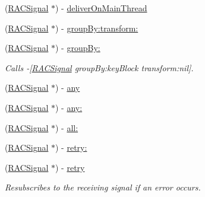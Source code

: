 \begin{DoxyCompactItemize}
\item 
(\mbox{\hyperlink{interface_r_a_c_signal}{R\+A\+C\+Signal}} $\ast$) -\/ \mbox{\hyperlink{category_r_a_c_signal_07_operations_08_a0c7042ce0eb6c729bc38421295296db1}{deliver\+On\+Main\+Thread}}
\item 
(\mbox{\hyperlink{interface_r_a_c_signal}{R\+A\+C\+Signal}} $\ast$) -\/ \mbox{\hyperlink{category_r_a_c_signal_07_operations_08_ad04cf174e24905df96f211b60e31a3cd}{group\+By\+:transform\+:}}
\item 
\mbox{\label{category_r_a_c_signal_07_operations_08_a35f9a656ad047d90f6997aee136782e5}} 
(\mbox{\hyperlink{interface_r_a_c_signal}{R\+A\+C\+Signal}} $\ast$) -\/ \mbox{\hyperlink{category_r_a_c_signal_07_operations_08_a35f9a656ad047d90f6997aee136782e5}{group\+By\+:}}
\begin{DoxyCompactList}\small\item\em Calls -\/\mbox{[}\mbox{\hyperlink{interface_r_a_c_signal}{R\+A\+C\+Signal}} group\+By\+:key\+Block transform\+:nil\mbox{]}. \end{DoxyCompactList}\item 
(\mbox{\hyperlink{interface_r_a_c_signal}{R\+A\+C\+Signal}} $\ast$) -\/ \mbox{\hyperlink{category_r_a_c_signal_07_operations_08_af64359cf92ab95039f48270a71446e08}{any}}
\item 
(\mbox{\hyperlink{interface_r_a_c_signal}{R\+A\+C\+Signal}} $\ast$) -\/ \mbox{\hyperlink{category_r_a_c_signal_07_operations_08_a4bfb6af6556526457fbf0e5d3c878536}{any\+:}}
\item 
(\mbox{\hyperlink{interface_r_a_c_signal}{R\+A\+C\+Signal}} $\ast$) -\/ \mbox{\hyperlink{category_r_a_c_signal_07_operations_08_adb70e0b813cec0b7bcc5c76f2f3cd88f}{all\+:}}
\item 
(\mbox{\hyperlink{interface_r_a_c_signal}{R\+A\+C\+Signal}} $\ast$) -\/ \mbox{\hyperlink{category_r_a_c_signal_07_operations_08_a3601540c46ceb34dbd1c242782022809}{retry\+:}}
\item 
\mbox{\label{category_r_a_c_signal_07_operations_08_a4fb19910fa59ca689d5f63bbd880e1e8}} 
(\mbox{\hyperlink{interface_r_a_c_signal}{R\+A\+C\+Signal}} $\ast$) -\/ \mbox{\hyperlink{category_r_a_c_signal_07_operations_08_a4fb19910fa59ca689d5f63bbd880e1e8}{retry}}
\begin{DoxyCompactList}\small\item\em Resubscribes to the receiving signal if an error occurs. \end{DoxyCompactList}\item 

\end{DoxyCompactItemize}
